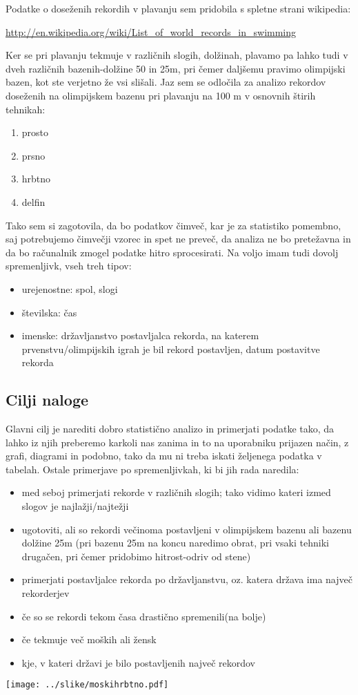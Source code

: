 \documentclass[11pt,a4paper]{article}
\begin{document}
Podatke o doseženih rekordih v plavanju sem pridobila s spletne strani wikipedia:

\url{http://en.wikipedia.org/wiki/List_of_world_records_in_swimming}

Ker se pri plavanju tekmuje v različnih slogih, dolžinah, plavamo pa lahko tudi v dveh različnih bazenih-dolžine 50 in 25m, pri čemer daljšemu pravimo olimpijski bazen, kot ste verjetno že vsi slišali. Jaz sem se odločila za analizo rekordov doseženih na olimpijskem bazenu pri plavanju na 100 m  v osnovnih štirih tehnikah:


\begin{enumerate}
\item prosto
\item prsno
\item hrbtno
\item delfin
\end{enumerate}

Tako sem si zagotovila, da bo podatkov čimveč, kar je za statistiko pomembno, saj potrebujemo čimvečji vzorec in spet ne preveč, da analiza ne bo pretežavna in da bo računalnik zmogel podatke hitro sprocesirati. Na voljo imam tudi dovolj spremenljivk, vseh treh tipov:

\begin{itemize}
\item urejenostne: spol, slogi
\item številska: čas
\item imenske: državljanstvo postavljalca rekorda, na katerem prvenstvu/olimpijskih igrah je bil rekord postavljen, datum postavitve rekorda
\end{itemize}

\subsection{Cilji naloge}


Glavni cilj je narediti dobro statistično analizo in primerjati podatke tako, da lahko iz njih preberemo karkoli nas zanima in to na uporabniku prijazen način, z grafi, diagrami in podobno, tako da mu ni treba iskati željenega podatka v tabelah. Ostale primerjave po spremenljivkah, ki bi jih rada naredila:
\begin{itemize}
\item med seboj primerjati rekorde v različnih slogih; tako vidimo kateri izmed slogov je najlažji/najtežji
\item ugotoviti, ali so rekordi večinoma postavljeni v olimpijskem bazenu ali bazenu dolžine 25m (pri bazenu 25m na koncu naredimo obrat, pri vsaki tehniki drugačen, pri čemer pridobimo hitrost-odriv od stene)
\item primerjati postavljalce rekorda po državljanstvu, oz. katera država ima največ rekorderjev
\item če so se rekordi tekom časa drastično spremenili(na bolje)
\item če tekmuje več moških ali žensk
\item kje, v kateri državi je bilo postavljenih največ rekordov
\end{itemize}

\texttt{[image: ../slike/moskihrbtno.pdf]}
\end{document}
